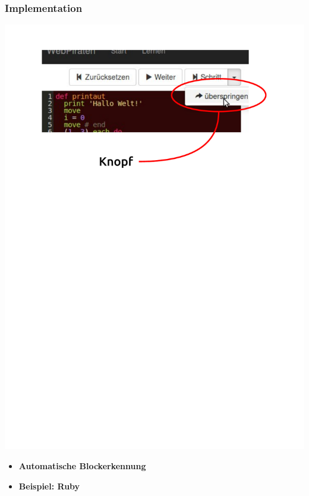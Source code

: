 \begin{frame}
	\frametitle{Implementation}
	\begin{center}
		\includegraphics[scale=0.5]{scopes/button.pdf}
	\end{center}
\end{frame}

\begin{frame}
	\begin{itemize}
		\item[]\textbf{Automatische Blockerkennung} \\
		\item[]\textbf{Beispiel: Ruby} \\
	\end{itemize}
\end{frame}


